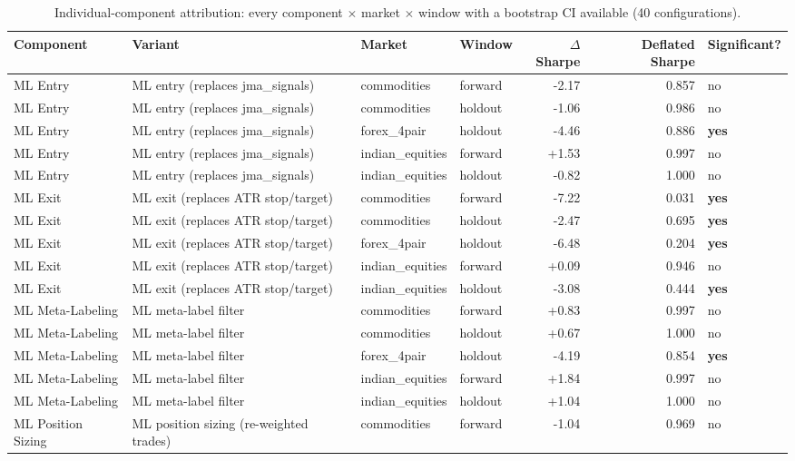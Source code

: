 \begin{longtable}{p{2.6cm} p{3.3cm} l l r r l}
\caption{Individual-component attribution: every component $\times$ market $\times$ window with a bootstrap CI available (40 configurations).} \label{tab:attribution} \\
\toprule
Component & Variant & Market & Window & $\Delta$Sharpe & Deflated Sharpe & Significant? \\
\midrule
\endhead
\bottomrule
\endfoot
ML Entry & ML entry (replaces jma\_signals) & commodities & forward & -2.17 & 0.857 & no \\
ML Entry & ML entry (replaces jma\_signals) & commodities & holdout & -1.06 & 0.986 & no \\
ML Entry & ML entry (replaces jma\_signals) & forex\_4pair & holdout & -4.46 & 0.886 & \textbf{yes} \\
ML Entry & ML entry (replaces jma\_signals) & indian\_equities & forward & +1.53 & 0.997 & no \\
ML Entry & ML entry (replaces jma\_signals) & indian\_equities & holdout & -0.82 & 1.000 & no \\
ML Exit & ML exit (replaces ATR stop/target) & commodities & forward & -7.22 & 0.031 & \textbf{yes} \\
ML Exit & ML exit (replaces ATR stop/target) & commodities & holdout & -2.47 & 0.695 & \textbf{yes} \\
ML Exit & ML exit (replaces ATR stop/target) & forex\_4pair & holdout & -6.48 & 0.204 & \textbf{yes} \\
ML Exit & ML exit (replaces ATR stop/target) & indian\_equities & forward & +0.09 & 0.946 & no \\
ML Exit & ML exit (replaces ATR stop/target) & indian\_equities & holdout & -3.08 & 0.444 & \textbf{yes} \\
ML Meta-Labeling & ML meta-label filter & commodities & forward & +0.83 & 0.997 & no \\
ML Meta-Labeling & ML meta-label filter & commodities & holdout & +0.67 & 1.000 & no \\
ML Meta-Labeling & ML meta-label filter & forex\_4pair & holdout & -4.19 & 0.854 & \textbf{yes} \\
ML Meta-Labeling & ML meta-label filter & indian\_equities & forward & +1.84 & 0.997 & no \\
ML Meta-Labeling & ML meta-label filter & indian\_equities & holdout & +1.04 & 1.000 & no \\
ML Position Sizing & ML position sizing (re-weighted trades) & commodities & forward & -1.04 & 0.969 & no \\

\end{longtable}
